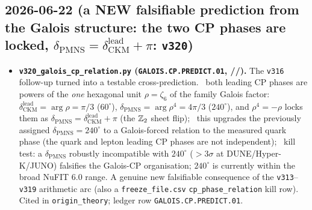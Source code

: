 \subsection*{2026-06-22 (a NEW falsifiable prediction from the Galois structure: the two CP phases are locked, $\delta_{\mathrm{PMNS}}=\delta_{\mathrm{CKM}}^{\mathrm{lead}}+\pi$: \texttt{v320})}
\begin{itemize}
\item \textbf{\texttt{v320\_galois\_cp\_relation.py} (\texttt{GALOIS.CP.PREDICT.01}, \mE/\mC/\mX).} The \texttt{v316}
  follow-up turned into a testable cross-prediction. \mE\ both leading CP phases are powers of the \emph{one}
  hexagonal unit $\rho=\zeta_6$ of the family Galois factor: $\delta_{\mathrm{CKM}}^{\mathrm{lead}}=\arg\rho=\pi/3$
  ($60^\circ$), $\delta_{\mathrm{PMNS}}=\arg\rho^4=4\pi/3$ ($240^\circ$), and $\rho^4=-\rho$ locks them as
  $\delta_{\mathrm{PMNS}}=\delta_{\mathrm{CKM}}^{\mathrm{lead}}+\pi$ (the $\mathbb{Z}_2$ sheet flip); \mC\ this upgrades the
  previously assigned $\delta_{\mathrm{PMNS}}=240^\circ$ to a Galois-forced relation to the measured quark phase
  (the quark and lepton leading CP phases are not independent); \mX\ kill test: a $\delta_{\mathrm{PMNS}}$ robustly
  incompatible with $240^\circ$ ($>3\sigma$ at DUNE/Hyper-K/JUNO) falsifies the Galois-CP organisation; $240^\circ$
  is currently within the broad NuFIT 6.0 range. A genuine new falsifiable consequence of the \texttt{v313}--%
  \texttt{v319} arithmetic arc (also a \texttt{freeze\_file.csv} \texttt{cp\_phase\_relation} kill row). Cited in
  \texttt{origin\_theory}; ledger row \texttt{GALOIS.CP.PREDICT.01}.
\end{itemize}

